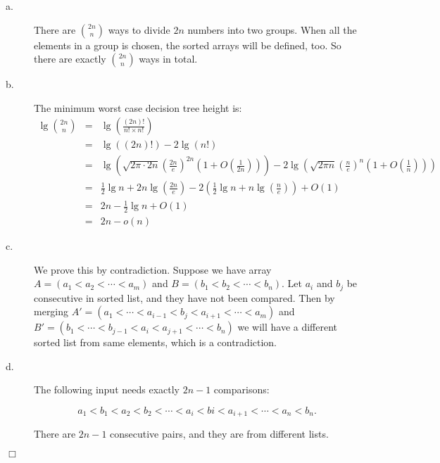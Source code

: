 \documentclass[a4paper,10pt]{article}
\newcommand{\qed}{\hfill \ensuremath{\Box}}
\begin{document}
\begin{description}
\item[a. \hspace{9pt}] There are $2n \choose n$ ways to divide $2n$ numbers into two groups. When all the elements in a group
is chosen, the sorted arrays will be defined, too. So there are exactly $2n \choose n$ ways in total.

\item[b. \hspace{9pt}] The minimum worst case decision tree height is:
\begin{eqnarray*}
\lg{2n \choose n} &=&\lg\left(\frac{(2n)!}{n!\times n!}\right) \\
    &=&\lg\left((2n)!\right) - 2\lg\left(n!\right) \\
    &=& \lg\left(\sqrt{2\pi\cdot 2n}\left(\frac{2n}{e}\right)^{2n}\left(1 +O\left(\frac{1}{2n}\right)\right)\right) 
        - 2\lg\left(\sqrt{2\pi n}\left(\frac{n}{e}\right)^{n}\left(1 +O\left(\frac{1}{n}\right)\right)\right)\\
    &=& \frac{1}{2}\lg{n} + 2n\lg\left(\frac{2n}{e}\right) 
        - 2\left(   \frac{1}{2}\lg{n} + n\lg\left(\frac{n}{e}\right)   \right) + O(1)\\
    &=& 2n - \frac{1}{2}\lg{n} + O(1)\\
    &=& 2n - o(n)
\end{eqnarray*}

\item[c. \hspace{9pt}]  We prove this by contradiction. Suppose we have array $A=(a_1 < a_2 < \cdots < a_m)$ and 
$B=(b_1 < b_2 < \cdots < b_n)$. Let $a_i$ and $b_j$ be consecutive in sorted list, and they have not been compared.
Then by merging $A'=(a_1 < \cdots < a_{i-1} < b_j < a_{i+1} <\cdots <  a_m)$ and
$B' = (b_1 < \cdots < b_{j-1} < a_i < a_{j+1}  < \cdots < b_n)$ we will have a different sorted list from same elements, 
which is a contradiction.

\item[d. \hspace{9pt}]  The following input needs exactly $2n-1$ comparisons:

$$a_1 < b_1 < a_2 < b_2 < \cdots < a_{i} < b{i} < a_{i+1} < \cdots < a_n < b_n.$$

There are $2n-1$ consecutive pairs, and they are from different lists.

\end{description}

\qed
\end{document}
